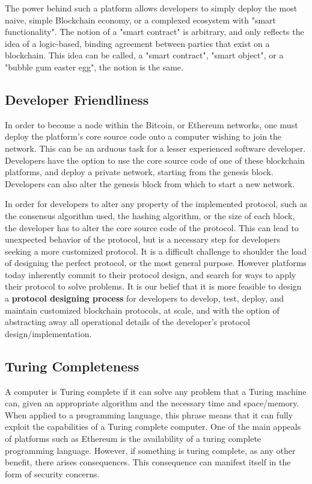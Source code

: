 \documentclass[12pt, titlepage, twocolumn]{report}
\begin{document}
The power behind such a platform allows developers to simply deploy the most naive, simple Blockchain economy, or a complexed ecosystem with "smart functionality". The notion of a "smart contract" is arbitrary, and only reflects the idea of a logic-based, binding agreement between parties that exist on a blockchain. This idea can be called, a "smart contract", "smart object", or a "bubble gum easter egg", the notion is the same.


\subsection{Developer Friendliness}
In order to become a node within the Bitcoin, or Ethereum networks, one must deploy the platform's core source code onto a computer wishing to join the network. This can be an arduous task for a lesser experienced software developer. Developers have the option to use the core source code of one of these blockchain platforms, and deploy a private network, starting from the genesis block. Developers can also alter the genesis block from which to start a new network.

In order for developers to alter any property of the implemented protocol, such as the consensus algorithm used, the hashing algorithm, or the size of each block, the developer has to alter the core source code of the protocol. This can lead to unexpected behavior of the protocol, but is a necessary step for developers seeking a more customized protocol. It is a difficult challenge to shoulder the load of designing the perfect protocol, or the most general purpose. However platforms today inherently commit to their protocol design, and search for ways to apply their protocol to solve problems. It is our belief that it is more feasible to design a \textbf{protocol designing process} for developers to develop, test, deploy, and maintain customized blockchain protocols, at scale, and with the option of abstracting away all operational details of the developer's protocol design/implementation.

\subsection{Turing Completeness}
A computer is Turing complete if it can solve any problem that a Turing machine can, given an appropriate algorithm and the necessary time and space/memory. When applied to a programming language, this phrase means that it can fully exploit the capabilities of a Turing complete computer. One of the main appeals of platforms such as Ethereum is the availability of a turing complete programming language. However, if something is turing complete, as any other benefit, there arises consequences. This consequence can manifest itself in the form of security concerns. 
\end{document}
